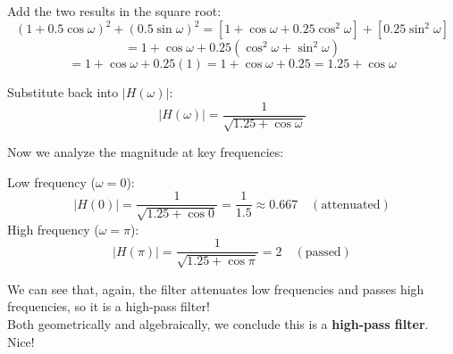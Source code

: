 \begin{enumerate}
{            Add the two results in the square root:
            \[
            (1 + 0.5\cos\omega)^2 + (0.5\sin\omega)^2 = \left[1 + \cos\omega + 0.25\cos^2\omega\right] + \left[0.25\sin^2\omega\right]
            \]
            \[
            = 1 + \cos\omega + 0.25\left(\cos^2\omega + \sin^2\omega\right)
            \]
            \[
            = 1 + \cos\omega + 0.25(1) = 1 + \cos\omega + 0.25 = 1.25 + \cos\omega
            \]


            Substitute back into \( |H(\omega)| \):
            \[
            |H(\omega)| = \frac{1}{\sqrt{1.25 + \cos\omega}}
            \]
                        
            Now we analyze the magnitude at key frequencies:
            
            Low frequency (\( \omega = 0 \)): 
                \[
                |H(0)| =  \frac{1}{\sqrt{1.25 + \cos0}} = \frac{1}{1.5} \approx 0.667 \quad (\text{attenuated})
                \]
            High frequency (\( \omega = \pi \)): 
                \[
                |H(\pi)| =  \frac{1}{\sqrt{1.25 + \cos\pi}} = 2 \quad (\text{passed})
                \]

            We can see that, again, the filter attenuates low frequencies and passes high frequencies, so it is a high-pass filter!\\

            Both geometrically and algebraically, we conclude this is a \textbf{high-pass filter}. Nice!
        }
\end{enumerate}
